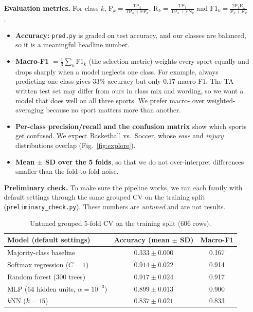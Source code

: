 \documentclass[12pt]{article}
\begin{document}
\textbf{Evaluation metrics.} For class $k$, $\text{P}_k=\frac{\text{TP}_k}{\text{TP}_k+\text{FP}_k}$, $\text{R}_k=\frac{\text{TP}_k}{\text{TP}_k+\text{FN}_k}$ and $\text{F1}_k=\frac{2\text{P}_k\text{R}_k}{\text{P}_k+\text{R}_k}$.
\begin{itemize}[leftmargin=*]
\item \textbf{Accuracy:} \texttt{pred.py} is graded on test accuracy, and our classes are balanced, so it is a meaningful headline number.
\item \textbf{Macro-F1} $=\frac13\sum_k\text{F1}_k$ (the selection metric) weights every sport equally and drops sharply when a model neglects one class. For example, always predicting one class gives 33\% accuracy but only 0.17 macro-F1. The TA-written test set may differ from ours in class mix and wording, so we want a model that does well on all three sports. We prefer macro- over weighted-averaging because no sport matters more than another.
\item \textbf{Per-class precision/recall and the confusion matrix} show which sports get confused. We expect Basketball vs.\ Soccer, whose \emph{ease} and \emph{injury} distributions overlap (Fig.~\ref{fig:explore}).
\item \textbf{Mean $\pm$ SD over the 5 folds}, so that we do not over-interpret differences smaller than the fold-to-fold noise.
\end{itemize}

\textbf{Preliminary check.} To make sure the pipeline works, we ran each family with default settings through the same grouped CV on the training split (\texttt{preliminary\_check.py}). These numbers are \emph{untuned} and are not results.

\begin{table}[h]
\centering\footnotesize
\caption{Untuned grouped 5-fold CV on the training split (606 rows).}\label{tab:prelim}
\begin{tabular}{@{}lcc@{}}
\toprule
Model (default settings) & Accuracy (mean $\pm$ SD) & Macro-F1 \\
\midrule
Majority-class baseline & $0.333 \pm 0.000$ & 0.167 \\
Softmax regression ($C=1$) & $0.914 \pm 0.022$ & 0.914 \\
Random forest (300 trees) & $0.917 \pm 0.024$ & 0.917 \\
MLP (64 hidden units, $\alpha=10^{-3}$) & $0.899 \pm 0.013$ & 0.900 \\
$k$NN ($k=15$) & $0.837 \pm 0.021$ & 0.833 \\
\bottomrule
\end{tabular}
\end{table}
\end{document}
